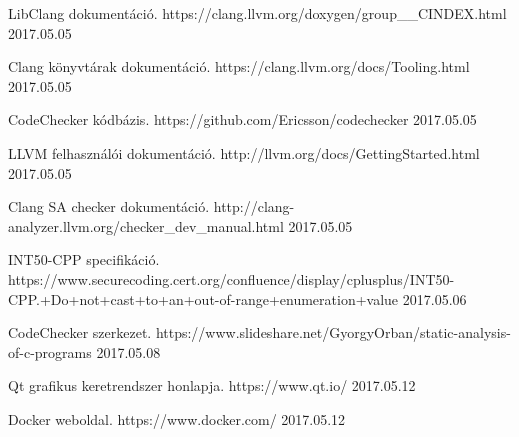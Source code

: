 \documentclass[a4paper,12pt]{report}
\begin{document}
\begin{thebibliography}{xx}
 LibClang dokumentáció. https://clang.llvm.org/doxygen/group\_\_CINDEX.html 2017.05.05

 Clang könyvtárak dokumentáció. https://clang.llvm.org/docs/Tooling.html 2017.05.05

 CodeChecker kódbázis. https://github.com/Ericsson/codechecker 2017.05.05

 LLVM felhasználói dokumentáció. http://llvm.org/docs/GettingStarted.html 2017.05.05

 Clang SA checker dokumentáció. http://clang-analyzer.llvm.org/checker\_dev\_manual.html 2017.05.05

 INT50-CPP specifikáció. https://www.securecoding.cert.org/confluence/display/cplusplus/INT50-CPP.+Do+not+cast+to+an+out-of-range+enumeration+value 2017.05.06

 CodeChecker szerkezet. https://www.slideshare.net/GyorgyOrban/static-analysis-of-c-programs 2017.05.08

 Qt grafikus keretrendszer honlapja. https://www.qt.io/ 2017.05.12

 Docker weboldal. https://www.docker.com/ 2017.05.12

\end{thebibliography}
\end{document}

